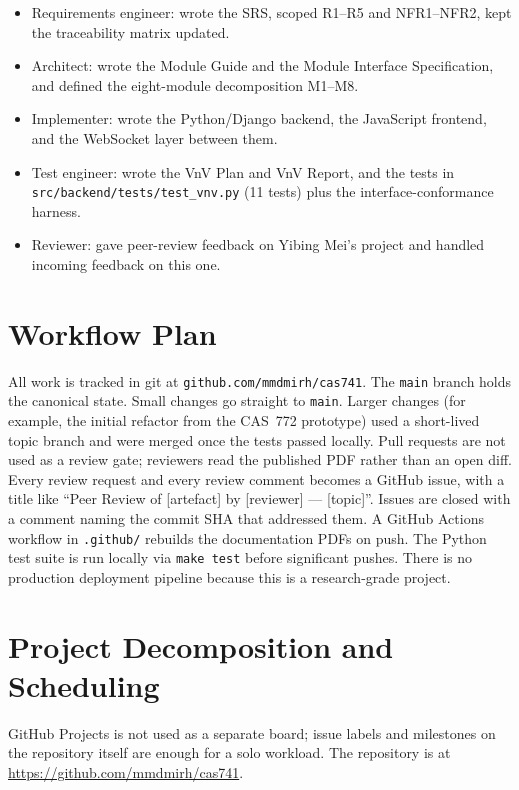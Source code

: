 \documentclass{article}
\begin{document}
\begin{itemize}
  \item Requirements engineer: wrote the SRS, scoped R1--R5 and
    NFR1--NFR2, kept the traceability matrix updated.
  \item Architect: wrote the Module Guide and the Module Interface
    Specification, and defined the eight-module decomposition M1--M8.
  \item Implementer: wrote the Python/Django backend, the JavaScript
    frontend, and the WebSocket layer between them.
  \item Test engineer: wrote the VnV Plan and VnV Report, and the
    tests in \texttt{src/backend/tests/test\_vnv.py} (11 tests) plus
    the interface-conformance harness.
  \item Reviewer: gave peer-review feedback on Yibing Mei's project
    and handled incoming feedback on this one.
\end{itemize}

\section{Workflow Plan}

All work is tracked in git at \texttt{github.com/mmdmirh/cas741}. The
\texttt{main} branch holds the canonical state. Small changes go
straight to \texttt{main}. Larger changes (for example, the initial
refactor from the CAS~772 prototype) used a short-lived topic branch
and were merged once the tests passed locally. Pull requests are not
used as a review gate; reviewers read the published PDF rather than an
open diff. Every review request and every review comment becomes a
GitHub issue, with a title like ``Peer Review of [artefact] by
[reviewer] --- [topic]''. Issues are closed with a comment naming the
commit SHA that addressed them. A GitHub Actions workflow in
\texttt{.github/} rebuilds the documentation PDFs on push. The Python
test suite is run locally via \texttt{make test} before significant
pushes. There is no production deployment pipeline because this is a
research-grade project.

\section{Project Decomposition and Scheduling}

GitHub Projects is not used as a separate board; issue labels and
milestones on the repository itself are enough for a solo workload.
The repository is at \url{https://github.com/mmdmirh/cas741}.
\end{document}

